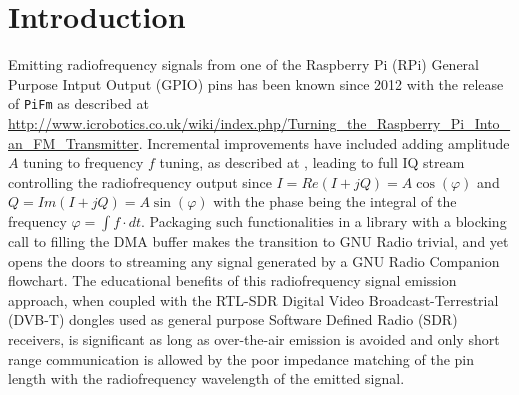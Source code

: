 \documentclass{article}
\begin{document}

\vskip 0.3in

\begin{abstract}
{\tt gr-rpitx} provides the support for the full GNU Radio signal processing framework when
using the Raspberry Pi internal radiofrequency Phase Locked Loop (PLL) controlled by the Pulse
Width Modulation (PWM) Direct Memory Access (DMA) for tuning the output frequency. Furthermore,
the {\tt librpitx} added amplitude tuning. Thanks to frequency and amplitude tuning capability,
full IQ datastreams can be processed, here within the framework of a GNU Radio Sink block. We
promote {\tt gr-rpitx}, despite the multiple spurious spectral components preventing the emission
over the air, for educational purposes including emitting and recording analog and digital communication
mode or probing the transfer function of a device under test in a scalar vector network analyzer
configuration.
\end{abstract}

\section{Introduction}\label{submission}

Emitting radiofrequency signals from one of the Raspberry Pi (RPi) General Purpose Intput
Output (GPIO) pins has been known since 2012 with the release of {\tt PiFm} as described
at \url{http://www.icrobotics.co.uk/wiki/index.php/Turning_the_Raspberry_Pi_Into_an_FM_Transmitter}.
Incremental improvements have included adding amplitude $A$ tuning to frequency $f$ tuning, as
described at \cite{sdra}, leading to full IQ stream controlling the radiofrequency output
since $I=Re(I+jQ)=A\cos(\varphi)$ and $Q=Im(I+jQ)=A\sin(\varphi)$ with the phase
being the integral of the frequency $\varphi=\int f\cdot dt$. Packaging such functionalities
in a library with a blocking call to filling the DMA buffer makes the transition to GNU Radio
trivial, and yet opens the doors to streaming any signal generated by a GNU Radio Companion
flowchart. The educational benefits of this radiofrequency signal emission approach, when
coupled with the RTL-SDR Digital Video Broadcast-Terrestrial (DVB-T) dongles used as general
purpose Software Defined Radio (SDR) receivers, is significant as long as over-the-air emission
is avoided and only short range communication is allowed by the poor impedance matching of the
pin length with the radiofrequency wavelength of the emitted signal.
\end{document}
